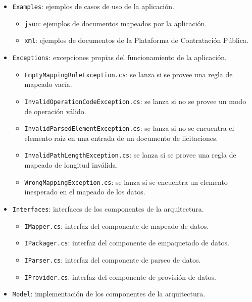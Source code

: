         \begin{itemize}
            \item \texttt{Examples}: ejemplos de casos de uso de la aplicación.
                \begin{itemize}
                    \item \texttt{json}: ejemplos de documentos mapeados por la aplicación.
                    \item \texttt{xml}: ejemplos de documentos de la Plataforma de Contratación Pública.
                \end{itemize}
            \item \texttt{Exceptions}: excepciones propias del funcionamiento de la aplicación.
                \begin{itemize}
                    \item \texttt{EmptyMappingRuleException.cs}: se lanza si se provee una regla de mapeado vacía.
                    \item \texttt{InvalidOperationCodeException.cs}: se lanza si no se provee un modo de operación válido.
                    \item \texttt{InvalidParsedElementException.cs}: se lanza si no se encuentra el elemento raíz en una entrada de un documento de licitaciones.
                    \item \texttt{InvalidPathLengthException.cs}: se lanza si se provee una regla de mapeado de longitud inválida.
                    \item \texttt{WrongMappingException.cs}: se lanza si se encuentra un elemento inesperado en el mapeado de los datos.
                \end{itemize}
            \item \texttt{Interfaces}: interfaces de los componentes de la arquitectura.
                \begin{itemize}
                    \item \texttt{IMapper.cs}: interfaz del componente de mapeado de datos.
                    \item \texttt{IPackager.cs}: interfaz del componente de empaquetado de datos.
                    \item \texttt{IParser.cs}: interfaz del componente de parseo de datos.
                    \item \texttt{IProvider.cs}: interfaz del componente de provisión de datos.
                \end{itemize}
            \item \texttt{Model}: implementación de los componentes de la arquitectura.

\end{itemize}
